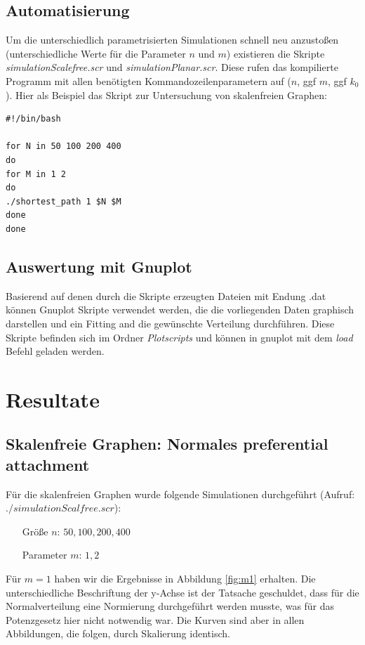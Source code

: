 \documentclass[10pt]{article}
\begin{document}
\subsection{Automatisierung}
Um die unterschiedlich parametrisierten Simulationen schnell neu anzustoßen (unterschiedliche Werte für die Parameter $n$ und $m$) existieren die Skripte \textit{simulationScalefree.scr} und \textit{simulationPlanar.scr}. Diese rufen das kompilierte Programm mit allen benötigten Kommandozeilenparametern auf ($n$, ggf $m$, ggf $k_0$). Hier als Beispiel das Skript zur Untersuchung von skalenfreien Graphen:

\begin{lstlisting}
#!/bin/bash

for N in 50 100 200 400
do
for M in 1 2
do
./shortest_path 1 $N $M
done
done
\end{lstlisting}

\subsection{Auswertung mit Gnuplot}
Basierend auf denen durch die Skripte erzeugten Dateien mit Endung .dat können Gnuplot Skripte verwendet werden, die die vorliegenden Daten graphisch darstellen und ein Fitting and die gewünschte Verteilung durchführen. Diese Skripte befinden sich im Ordner \textit{Plotscripts} und können in gnuplot mit dem \textit{load} Befehl geladen werden.


\section{Resultate}
\subsection{Skalenfreie Graphen: Normales preferential attachment}
Für die skalenfreien Graphen wurde folgende Simulationen durchgeführt (Aufruf: $./simulationScalfree.scr$): 
\begin{itemize}
\item[\quad Größe $n$:] $50,100,200,400$
\item[\quad Parameter $m$:] $1,2$
\end{itemize}
Für $m=1$ haben wir die Ergebnisse in Abbildung \ref{fig:m1} erhalten. Die unterschiedliche Beschriftung der y-Achse ist der Tatsache geschuldet, dass für die Normalverteilung eine Normierung durchgeführt werden musste, was für das Potenzgesetz hier nicht notwendig war. Die Kurven sind aber in allen Abbildungen, die folgen, durch Skalierung identisch.
\end{document}
